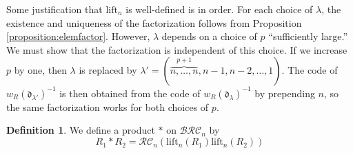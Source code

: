 \documentclass{amsart}
\theoremstyle{definition}
\newtheorem{definition}[lemma]{Definition}
\theoremstyle{remark}
\numberwithin{equation}{subsection}
\newcommand{\wof}[1]{w_{#1}}
\newcommand{\BRC}{\mathcal{BRC}}
\newcommand{\RC}{\mathcal{RC}}
\newcommand{\dom}{\mathfrak{d}}
\begin{document}
Some justification that $\mathrm{lift}_n$ is well-defined is in order. For each choice of $\lambda$, the existence and uniqueness of the factorization follows from Proposition \ref{proposition:elemfactor}. However, $\lambda$ depends on a choice of $p$ ``sufficiently large.'' We must show that the factorization is independent of this choice. If we increase $p$ by one, then $\lambda$ is replaced by $\lambda' = (\overbrace{n,\ldots,n}^{p+1},n-1,n-2,\ldots,1)$. The code of $\wof{R}(\dom_{\lambda'})^{-1}$ is then obtained from the code of $\wof{R}(\dom_\lambda)^{-1}$ by prepending $n$, so the same factorization works for both choices of $p$.

\begin{definition}
We define a product $*$ on $\BRC_n$ by
$$R_1*R_2 = \RC_n(\mathrm{lift}_n(R_1)\mathrm{lift}_n(R_2))$$
\end{definition}
\end{document}
